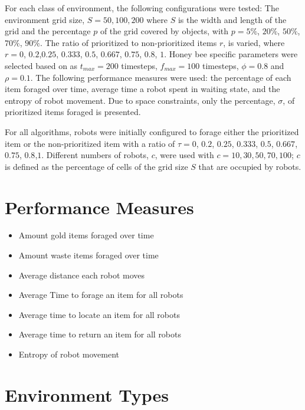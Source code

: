 	
For each class of environment, the following configurations were tested: The environment grid size, $S=50,100,200$ where $S$ is the width and length of the grid and the percentage $p$ of the grid covered by objects, with $p= 5\%$, $20\%$, $50\%$, $70\%$, $90\%$. The ratio of prioritized to non-prioritized items $r$, is varied, where $r=0$, $0.2$,$0.25$, $0.333$, $0.5$, $0.667$, $0.75$, $0.8$, $1$. Honey bee specific parameters were selected based on \cite{seeley2009wisdom} as 
$t_{max}=200$ timesteps, $f_{max}=100$ timesteps, $\phi=0.8$ and $\rho=0.1$.
The following performance measures were used: the percentage of each item foraged over time, average time a robot spent in waiting state, and the entropy of robot movement. Due to space constraints, only the percentage, $\sigma$, of prioritized items foraged is presented. 

For all algorithms, robots were initially configured to forage either the prioritized item or the non-prioritized item with a ratio of $\tau=0$, $0.2$, $0.25$, $0.333$, $0.5$, $0.667$, $0.75$, $0.8$,$1$. Different numbers of robots, $c$, were used with $c=10, 30, 50, 70, 100$; $c$ is defined as the percentage of cells of the grid size $S$ that are occupied by robots.

\section{Performance Measures}
\label{thri:third:performancemeasures}

	\begin{itemize}
		\item	Amount gold items foraged over time
		\item	Amount waste items foraged over time
		\item	Average distance each robot moves
		\item	Average Time to forage an item for all robots
		\item	Average time to locate an item for all robots
		\item	Average time to return an item for all robots
		\item	Entropy of robot movement
	\end{itemize}
	

\section{Environment Types}
\label{thri:third:environmenttypes}

